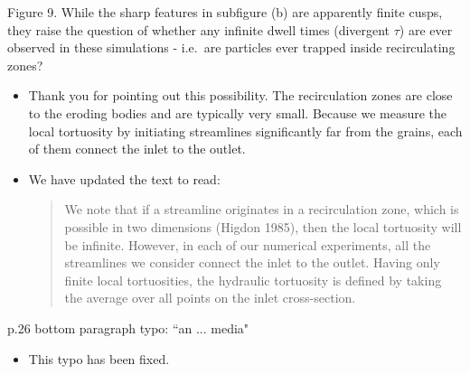 \documentclass[11pt]{article}
\newcommand{\comment}[1]{{\color{blue} #1}}
\begin{document}
\noindent
\comment{Figure 9.  While the sharp features in subfigure (b) are
apparently finite cusps, they raise the question of whether any infinite
dwell times (divergent $\tau$) are ever observed in these simulations -
i.e.~are particles ever trapped inside recirculating zones?}
\begin{itemize}
  \item Thank you for pointing out this possibility. The
    recirculation zones are close to the eroding bodies and are
    typically very small. Because we measure the local tortuosity by
    initiating streamlines significantly far from the grains, each of
    them connect the inlet to the outlet.

  \item We have updated the text to read:
    \begin{quotation}
      \noindent
      We note that if a streamline originates in a recirculation zone,
      which is possible in two dimensions (Higdon 1985), then the local
      tortuosity will be infinite. However, in each of our numerical
      experiments, all the streamlines we consider connect the inlet to
      the outlet.  Having only finite local tortuosities, the hydraulic
      tortuosity is defined by taking the average over all points on the
      inlet cross-section.
    \end{quotation}
\end{itemize}

\noindent
\comment{p.26 bottom paragraph typo: ``an ... media"}
\begin{itemize}
  \item This typo has been fixed.
\end{itemize}
\end{document}
